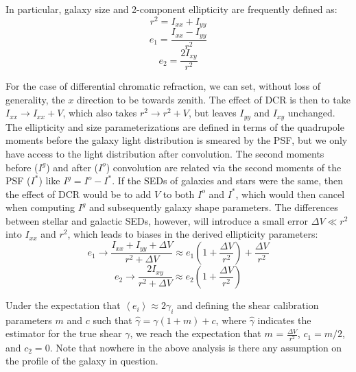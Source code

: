 \documentclass[apj]{emulateapj}
\begin{document}
In particular, galaxy size and 2-component ellipticity are frequently defined as:
\begin{equation}
  r^2 = I_{xx} + I_{yy}
\end{equation}
\begin{equation}
  e_1 = \frac{I_{xx} - I_{yy}}{r^2}
\end{equation}
\begin{equation}
  e_2 = \frac{2 I_{xy}}{r^2}
\end{equation}

For the case of differential chromatic refraction, we can set, without
loss of generality, the $x$ direction to be towards zenith.  The
effect of DCR is then to take $I_{xx} \rightarrow I_{xx} + V$, which
also takes $r^2 \rightarrow r^2 + V$, but leaves $I_{yy}$ and $I_{xy}$
unchanged.  The ellipticity and size parameterizations are defined in
terms of the quadrupole moments before the galaxy light distribution
is smeared by the PSF, but we only have access to the light
distribution after convolution.  The second moments before ($I^g$) and
after ($I^o$) convolution are related via the second moments of the
PSF ($I^*$) like $I^g = I^o - I^*$.  If the SEDs of galaxies and stars
were the same, then the effect of DCR would be to add $V$ to both
$I^o$ and $I^*$, which would then cancel when computing $I^g$ and
subsequently galaxy shape parameters.  The differences between stellar
and galactic SEDs, however, will introduce a small error $\Delta V \ll
r^2$ into $I_{xx}$ and $r^2$, which leads to biases in the derived
ellipticity parameters:
\begin{equation}
  e_1 \rightarrow \frac{I_{xx} + I_{yy} + \Delta V}{r^2 + \Delta V} \approx e_1 \left(1 + \frac{\Delta V}{r^2}\right) + \frac{\Delta V}{r^2}
\end{equation}
\begin{equation}
  e_2 \rightarrow \frac{2 I_{xy}}{r^2 + \Delta V} \approx e_2 \left(1 + \frac{\Delta V}{r^2}\right)
\end{equation}

Under the expectation that $\left<e_i\right> \approx 2\gamma_i$ and
defining the shear calibration parameters $m$ and $c$ such that
$\hat{\gamma} = \gamma (1 + m) + c$, where $\hat{\gamma}$ indicates
the estimator for the true shear $\gamma$, we reach the expectation
that $m$ = $\frac{\Delta V}{r^2}$, $c_1 = m/2$, and $c_2 = 0$.  Note
that nowhere in the above analysis is there any assumption on the
profile of the galaxy in question.
\end{document}
